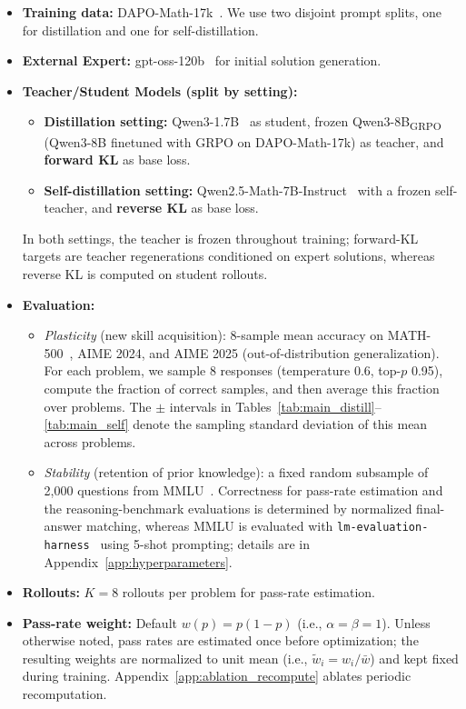 \documentclass{article}
\begin{document}
\begin{itemize}
    \item \textbf{Training data:} DAPO-Math-17k~\citep{yu2025dapo}. We use two disjoint prompt splits, one for distillation and one for self-distillation.
    \item \textbf{External Expert:} gpt-oss-120b~\citep{openai2025gptoss} for initial solution generation.
    \item \textbf{Teacher/Student Models (split by setting):}
    \begin{itemize}
      \item \textbf{Distillation setting:} Qwen3-1.7B~\citep{qwen2025qwen3} as student, frozen Qwen3-8B\textsubscript{GRPO} (Qwen3-8B finetuned with GRPO on DAPO-Math-17k) as teacher, and \textbf{forward KL} as base loss.
      \item \textbf{Self-distillation setting:} Qwen2.5-Math-7B-Instruct~\citep{yang2024qwen25math} with a frozen self-teacher, and \textbf{reverse KL} as base loss.
    \end{itemize}
    In both settings, the teacher is frozen throughout training; forward-KL targets are teacher regenerations conditioned on expert solutions, whereas reverse KL is computed on student rollouts.
    \item \textbf{Evaluation:}
    \begin{itemize}
      \item \emph{Plasticity} (new skill acquisition): 8-sample mean accuracy on MATH-500~\citep{hendrycks2021math}, AIME 2024, and AIME 2025 (out-of-distribution generalization). For each problem, we sample 8 responses (temperature 0.6, top-$p$ 0.95), compute the fraction of correct samples, and then average this fraction over problems. The $\pm$ intervals in Tables~\ref{tab:main_distill}--\ref{tab:main_self} denote the sampling standard deviation of this mean across problems.
      \item \emph{Stability} (retention of prior knowledge): a fixed random subsample of 2{,}000 questions from MMLU~\citep{hendrycks2021mmlu}. Correctness for pass-rate estimation and the reasoning-benchmark evaluations is determined by normalized final-answer matching, whereas MMLU is evaluated with \texttt{lm-evaluation-harness}~\citep{eval-harness} using 5-shot prompting; details are in Appendix~\ref{app:hyperparameters}.
    \end{itemize}
    \item \textbf{Rollouts:} $K = 8$ rollouts per problem for pass-rate estimation.
    \item \textbf{Pass-rate weight:} Default $w(p)=p(1-p)$ (i.e., $\alpha=\beta=1$). Unless otherwise noted, pass rates are estimated once before optimization; the resulting weights are normalized to unit mean (i.e., $\tilde{w}_i = w_i / \bar{w}$) and kept fixed during training. Appendix~\ref{app:ablation_recompute} ablates periodic recomputation.

\end{itemize}
\end{document}
